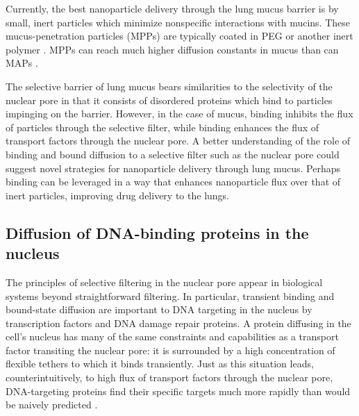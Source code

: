 Currently, the best nanoparticle delivery through the lung mucus barrier is by small, inert particles which minimize nonspecific interactions with mucins.  These mucus-penetration particles (MPPs) are typically coated in PEG or another inert polymer \cite{schneider17, huang17}.  MPPs can reach much higher diffusion constants in mucus than can MAPs \cite{mastorakos15,lai11,porsio18,tang09}.

The selective barrier of lung mucus bears similarities to the selectivity of the nuclear pore in that it consists of disordered proteins which bind to particles impinging on the barrier.  However, in the case of mucus, binding inhibits the flux of particles through the selective filter, while binding enhances the flux of transport factors through the nuclear pore.  A better understanding of the role of binding and bound diffusion to a selective filter such as the nuclear pore could suggest novel strategies for nanoparticle delivery through lung mucus.  Perhaps binding can be leveraged in a way that enhances nanoparticle flux over that of inert particles, improving drug delivery to the lungs.

\subsection{Diffusion of DNA-binding proteins in the nucleus}

The principles of selective filtering in the nuclear pore appear in biological systems beyond straightforward filtering.  In particular, transient binding and bound-state diffusion are important to DNA targeting in the nucleus by transcription factors and DNA damage repair proteins.  A protein diffusing in the cell's nucleus has many of the same constraints and capabilities as a transport factor transiting the nuclear pore: it is surrounded by a high concentration of flexible tethers to which it binds transiently.  Just as this situation leads, counterintuitively, to high flux of transport factors through the nuclear pore, DNA-targeting proteins find their specific targets much more rapidly than would be naively predicted \cite{mirny09}.  

